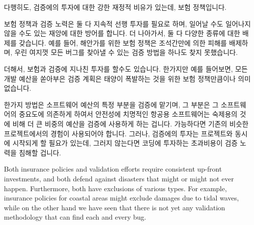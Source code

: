 다행히도, 검증에의 투자에 대한 강한 재정적 비유가 있는데, 보험 정책입니다.

\iffalse

The decision to nevertheless invest in validation is often forced by
experienced people with forceful personalities.
But this is no guarantee, given that other stakeholders might also
have forceful personalities.
Worse yet, these other stakeholders might bring stories of expensive
validation efforts that nevertheless allowed embarrassing bugs to
escape to the end users.
So although a scarred, grey-haired, and grouchy veteran might carry
the day, a more organized approach would perhaps be more useful.

Fortunately, there is a strictly financial analog to investments in
validation, and that is the insurance policy.

\fi


보험 정책과 검증 노력은 둘 다 지속적 선행 투자를 필요로 하며, 일어날 수도
일어나지 않을 수도 있는 재앙에 대한 방어를 합니다.
더 나아가서, 둘 다 다양한 종류에 대한 배제를 갖습니다.
예를 들어, 해안가를 위한 보험 정책은 조석간만에 의한 피해를 배제하며, 우린
여지껏 모든 버그를 찾아낼 수 있는 검증 방법을 하나도 찾지 못했습니다.

더해서, 보험과 검증에 지나친 투자를 할수도 있습니다.
한가지만 예를 들어보면, 모든 개발 예산을 쏟아부은 검증 계획은 태양이 폭발하는
것을 위한 보험 정책만큼이나 의미없습니다.

한가지 방법은 소프트웨어 예산의 특정 부분을 검증에 맡기며, 그 부분은 그
소프트웨어의 중요도에 의존하게 하여서 안전성에 치명적인 항공용 소프트웨어는
숙제용의 것에 비해 더 큰 비중의 예산을 검증에 사용하게 하는 겁니다.
가능하다면 기존의 비슷한 프로젝트에서의 경험이 사용되어야 합니다.
그러나, 검증에의 투자는 프로젝트와 동시에 시작되게 할 필요가 있는데, 그러지
않는다면 코딩에 투자하는 초과비용이 검증 노력을 침해할 겁니다.

\iffalse

Both insurance policies and validation efforts require consistent
up-front investments, and both defend against disasters that might
or might not ever happen.
Furthermore, both have exclusions of various types.
For example, insurance policies for coastal areas might exclude
damages due to tidal waves, while on the other hand we have seen
that there is not yet any validation methodology that can find
each and every bug.

